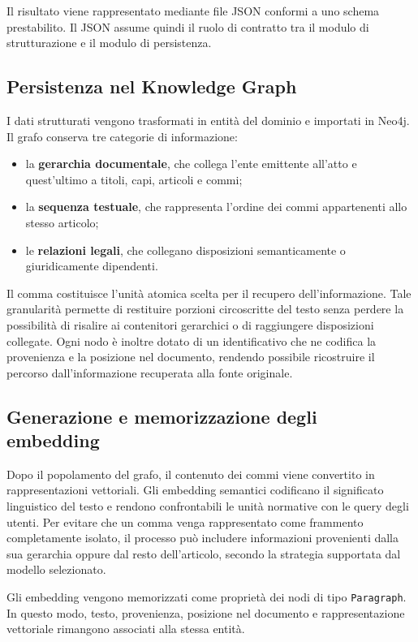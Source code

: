 Il risultato viene rappresentato mediante file JSON conformi a uno schema prestabilito. Il JSON assume quindi il ruolo di contratto tra il modulo di strutturazione e il modulo di persistenza.


\subsection{Persistenza nel Knowledge Graph}

I dati strutturati vengono trasformati in entità del dominio e importati in Neo4j. Il grafo conserva tre categorie di informazione:

\begin{itemize}
    \item la \textbf{gerarchia documentale}, che collega l'ente emittente all'atto e quest'ultimo a titoli, capi, articoli e commi;
    \item la \textbf{sequenza testuale}, che rappresenta l'ordine dei commi appartenenti allo stesso articolo;
    \item le \textbf{relazioni legali}, che collegano disposizioni semanticamente o giuridicamente dipendenti.
\end{itemize}

Il comma costituisce l'unità atomica scelta per il recupero dell'informazione. Tale granularità permette di restituire porzioni circoscritte del testo senza perdere la possibilità di risalire ai contenitori gerarchici o di raggiungere disposizioni collegate. Ogni nodo è inoltre dotato di un identificativo che ne codifica la provenienza e la posizione nel documento, rendendo possibile ricostruire il percorso dall'informazione recuperata alla fonte originale.

\subsection{Generazione e memorizzazione degli embedding}

Dopo il popolamento del grafo, il contenuto dei commi viene convertito in rappresentazioni vettoriali. Gli embedding semantici codificano il significato linguistico del testo e rendono confrontabili le unità normative con le query degli utenti. Per evitare che un comma venga rappresentato come frammento completamente isolato, il processo può includere informazioni provenienti dalla sua gerarchia oppure dal resto dell'articolo, secondo la strategia supportata dal modello selezionato.

Gli embedding vengono memorizzati come proprietà dei nodi di tipo \texttt{Paragraph}. In questo modo, testo, provenienza, posizione nel documento e rappresentazione vettoriale rimangono associati alla stessa entità.

